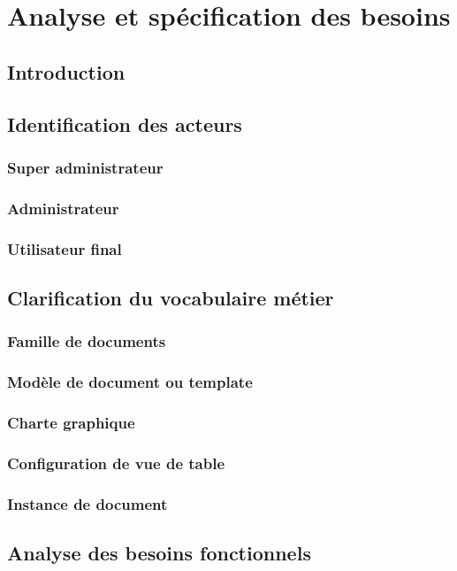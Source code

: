 \documentclass[12pt,a4paper]{report}
\begin{document}
\chapter{Analyse et spécification des besoins}

\section{Introduction}

\section{Identification des acteurs}
\subsection{Super administrateur}
\subsection{Administrateur}
\subsection{Utilisateur final}

\section{Clarification du vocabulaire métier}
\subsection{Famille de documents}
\subsection{Modèle de document ou template}
\subsection{Charte graphique}
\subsection{Configuration de vue de table}
\subsection{Instance de document}

\section{Analyse des besoins fonctionnels}
\end{document}
